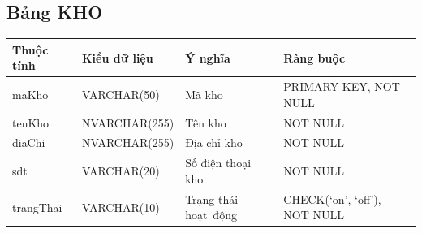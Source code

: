 \documentclass[a4paper,12pt]{report}
\begin{document}
\subsection{Bảng KHO}
\noindent
\begin{center}
    \begin{tabular}{|>{\centering\arraybackslash}p{3cm}|
        >{\centering\arraybackslash}p{4cm}|
        >{\centering\arraybackslash}p{4cm}|
        >{\centering\arraybackslash}p{4cm}|}
        \hline
        \textbf{Thuộc tính}                                                                                                               &
        \textbf{Kiểu dữ liệu}                                                                                                                             &
        \textbf{Ý nghĩa}                                                                                                 &
        \textbf{Ràng buộc}                                                                                                         \\
        \hline
        maKho &  VARCHAR(50)  & Mã kho & PRIMARY KEY, NOT NULL \\
        \hline
        tenKho &  NVARCHAR(255)  & Tên kho & NOT NULL \\                                                                                                                          
        \hline
        diaChi & NVARCHAR(255) & Địa chỉ kho & NOT NULL \\                                                                                                                          
        \hline
        sdt & VARCHAR(20) & Số điện thoại kho & NOT NULL \\                                                                                                                          
        \hline
        trangThai &  VARCHAR(10)  & Trạng thái hoạt~động & CHECK(‘on’, ‘off’), NOT NULL \\
        \hline
    \end{tabular}
\end{center}
\end{document}
